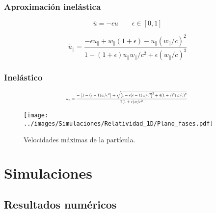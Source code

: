\documentclass{beamer}
\begin{document}
\begin{frame}
    \frametitle[prueb1]{Aproximación inelástica}
    \begin{equation*}
        \bar{u} = -\epsilon u \qquad \epsilon \in \left[ 0, 1 \right]
    \end{equation*}
    \begin{equation*}
        \bar{u}_\parallel = \dfrac{-\epsilon u_\parallel + w_\parallel (1 + \epsilon) -  u_\parallel (w_\parallel/c)^2}{1 - (1 + \epsilon)u_\parallel w_\parallel/c^2 + \epsilon (w_\parallel/c)^2}
    \end{equation*}
\end{frame}

\begin{frame}
    \frametitle[prueb1]{Inelástico} 
        \centering
        \vspace{-0.7cm}
            \begin{equation*}
                \scalebox{0.6}{$u_n = \dfrac{-\left[ 1 -  (\epsilon - 1)w/c^2 \right] + \sqrt{\left[ 1 - \epsilon (\epsilon - 1)w/c^2 \right]^2 + 4(1+\epsilon)^2(w/c)^2}}{2(1+\epsilon)w/c^2}$ }
            \end{equation*}
            \vspace{-1cm}
            \begin{figure}
                \centering
                \texttt{[image: ../images/Simulaciones/Relatividad\_1D/Plano\_fases.pdf]}
                \caption{Velocidades máximas de la partícula.}
            \end{figure}
\end{frame}


\section{Simulaciones}
\subsection{Resultados numéricos}
\end{document}
